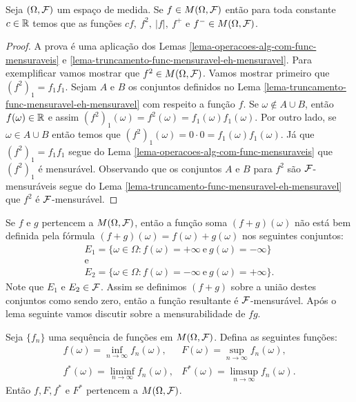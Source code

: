 \begin{corolario}
	Seja $(\Omega,\mathcal{F})$ um espaço de medida. Se $f\in M(\Omega,\mathcal{F})$
	então para toda constante $c\in \mathbb{R}$ temos que 
	as funções $cf,\ f^2,\ |f|,\ f^{+}$ e $f^{-}\in M(\Omega,\mathcal{F})$. 
\end{corolario} 

\begin{proof}
A prova é uma aplicação dos Lemas 
\ref{lema-operacoes-alg-com-func-mensuraveis} 
e
\ref{lema-truncamento-func-mensuravel-eh-mensuravel}.
Para exemplificar vamos mostrar que $f^2\in M(\Omega,\mathcal{F})$. 
Vamos mostrar primeiro que $(f^2)_1=f_1f_1$.
Sejam $A$ e $B$ os conjuntos definidos no Lema 
\ref{lema-truncamento-func-mensuravel-eh-mensuravel}
com respeito a função $f$.
Se $\omega \notin A\cup B$, então 
$f(\omega)\in\mathbb{R}$ e assim $(f^2)_1(\omega)=f^2(\omega) = f_1(\omega)f_1(\omega)$.
Por outro lado, se $\omega\in A\cup B$ então temos que 
$(f^2)_1(\omega)= 0\cdot 0 = f_1(\omega)f_1(\omega)$.
Já que $(f^2)_1=f_1f_1$ segue do 
Lema \ref{lema-operacoes-alg-com-func-mensuraveis} 
que $(f^2)_1$ é mensurável. Observando que os conjuntos 
$A$ e $B$ para $f^2$ são $\mathcal{F}$-mensuráveis segue do 
Lema \ref{lema-truncamento-func-mensuravel-eh-mensuravel}
que $f^2$ é $\mathcal{F}$-mensurável.
\end{proof}



\begin{observacao}
Se $f$ e $g$ pertencem a $M(\Omega,\mathcal{F})$, então a função 
soma $(f+g)(\omega)$ não está bem definida pela fórmula 
$(f+g)(\omega)=f(\omega)+g(\omega)$ nos seguintes conjuntos:
\[
\begin{array}{c}
	E_1=\{\omega\in\Omega: f(\omega)=+\infty\ \text{e}\ g(\omega)=-\infty\}
	\\
	\text{e}
	\\
	E_2=\{\omega\in\Omega: f(\omega)=-\infty\ \text{e}\ g(\omega)=+\infty\}.
\end{array}
\] 
Note que $E_1$ e $E_2\in \mathcal{F}$. Assim se definimos $(f+g)$ 
sobre a união destes conjuntos como sendo zero, 
então a função resultante é $\mathcal{F}$-mensurável. 
Após o lema seguinte vamos discutir sobre a mensurabilidade
de $fg$.
\end{observacao}



\begin{lema}\label{inf-sup-func-mensuraval-eh-mensuravel}
	Seja $\{f_n\}$ uma sequência de funções em $M(\Omega,\mathcal{F})$.
	Defina as seguintes funções:
	\[	
	\begin{array}{cc}
	\displaystyle
	f(\omega) = \inf_{n\to\infty}f_n(\omega), & 	
	\displaystyle
	F(\omega) = \sup_{n\to\infty}f_n(\omega),
	\\[0.5cm]
	\displaystyle
	f^*(\omega) = \liminf_{n\to\infty}f_n(\omega), & 	
	\displaystyle
	F^*(\omega) = \limsup_{n\to\infty}f_n(\omega).	
	\end{array}
	\]
Então $f,F,f^*$ e $F^*$ pertencem a $M(\Omega,\mathcal{F})$.
\end{lema}


